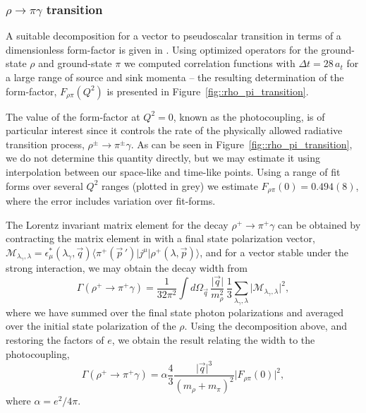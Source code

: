 \subsubsection{$\rho \rightarrow \pi \gamma$ transition}\label{rhopigamma}

A suitable decomposition for a vector to pseudoscalar transition in terms of a dimensionless form-factor is given in . Using optimized operators for the ground-state $\rho$ and ground-state $\pi$ we computed correlation functions with $\Delta t = 28\, a_t$ for a large range of source and sink momenta -- the resulting determination of the form-factor, $F_{\rho \pi}(Q^2)$ is presented in Figure~\ref{fig::rho_pi_transition}.

The value of the form-factor at $Q^2=0$, known as the photocoupling, is of particular interest since it controls the rate of the physically allowed radiative transition process, $\rho^\pm \to \pi^\pm \gamma$. As can be seen in Figure~\ref{fig::rho_pi_transition}, we do not determine this quantity directly, but we may estimate it using interpolation between our space-like and time-like points. Using a range of fit forms over several $Q^2$ ranges (plotted in grey) we estimate $F_{\rho \pi}(0) = 0.494(8)$, where the error includes variation over fit-forms.


The Lorentz invariant matrix element for the decay $\rho^+ \to \pi^+ \gamma$ can be obtained by contracting the matrix element in  with a final state polarization vector, $\mathcal{M}_{\lambda_\gamma,\lambda} = \epsilon^*_\mu(\lambda_\gamma,\vec{q}) \big\langle \pi^+(\vec{p}\,') \big| j^\mu \big| \rho^+(\lambda, \vec{p}) \big\rangle$,
and for a vector stable under the strong interaction, we may obtain the decay width from
\begin{equation*}
\Gamma(\rho^+\rightarrow \pi^+\gamma) = \frac{1}{32\pi^2}\int \!\! d\Omega_{\vec{q}} \, \frac{\lvert \vec{q}\rvert}{m_\rho^2} \,  \frac{1}{3} \sum_{\lambda_\gamma,\lambda} \lvert \mathcal{M}_{\lambda_\gamma,\lambda}  \rvert^2,
\end{equation*}
where we have summed over the final state photon polarizations and averaged over the initial state polarization of the $\rho$. Using the decomposition above, and restoring the factors of $e$, we obtain the result relating the width to the photocoupling,
\begin{equation*}
\Gamma(\rho^+\rightarrow \pi^+\gamma) = \alpha\frac{4}{3} \frac{\lvert \vec{q} \rvert^3}{(m_\rho \!+\! m_\pi)^2} \lvert F_{\rho \pi}(0) \rvert^2,
\end{equation*}
where $\alpha = e^2/4\pi$. 

